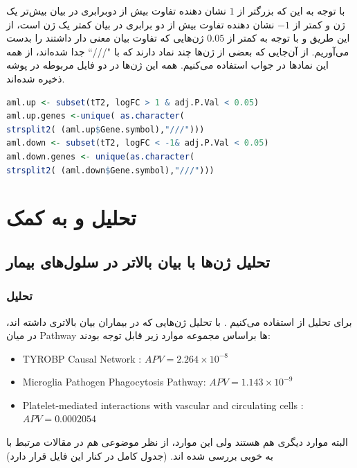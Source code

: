 \documentclass[12pt]{article}
\begin{document}
با توجه به این که  بزرگتر از $1$ نشان دهنده تفاوت بیش از دوبرابری در بیان بیش‌تر یک ژن و کمتر از $-1$ نشان دهنده تفاوت بیش از دو برابری در بیان کمتر یک ژن است، از این طریق و با توجه به  کمتر از $0.05$ ژن‌هایی که تفاوت بیان معنی دار داشتند را بدست می‌‌‌آوریم. از آن‌جایی که بعضی از ژن‌ها چند نماد دارند که با "///`` جدا شده‌اند،‌ از همه این نماد‌ها در جواب استفاده می‌کنیم. همه این ژن‌ها در دو فایل مربوطه در پوشه  ذخیره شده‌اند.




 \begin{latin}
	\begin{lstlisting}[language=R]
aml.up <- subset(tT2, logFC > 1 & adj.P.Val < 0.05)
aml.up.genes <-unique( as.character(
strsplit2( (aml.up$Gene.symbol),"///")))
aml.down <- subset(tT2, logFC < -1& adj.P.Val < 0.05)
aml.down.genes <- unique(as.character(
strsplit2( (aml.down$Gene.symbol),"///")))
	\end{lstlisting}
\end{latin}



\section{تحلیل  و  به کمک }

\subsection{تحلیل ژن‌ها با بیان بالاتر در سلول‌های بیمار}
\subsubsection{تحلیل }
برای تحلیل از  استفاده می‌کنیم \cite{enrichr,enrichr2}. با تحلیل ژن‌هایی که در بیماران بیان بالاتری داشته اند، در میان Pathway ها براساس مجموعه  موارد زیر قابل توجه بودند:
\begin{latin}
\begin{itemize}
	\item  {TYROBP Causal Network} : $APV = 2.264 \times 10^{-8}$
	
	\item  {Microglia Pathogen Phagocytosis Pathway}: $APV = 1.143 \times 10^{-9}$ 
	
	\item {Platelet-mediated interactions with vascular and circulating cells}  : $APV = 0.0002054$ 
\end{itemize}
\end{latin}
البته موارد دیگری هم هستند ولی این موارد، از نظر موضوعی هم در مقالات مرتبط با  به خوبی بررسی شده اند. (جدول کامل در کنار این فایل قرار دارد)
\end{document}
